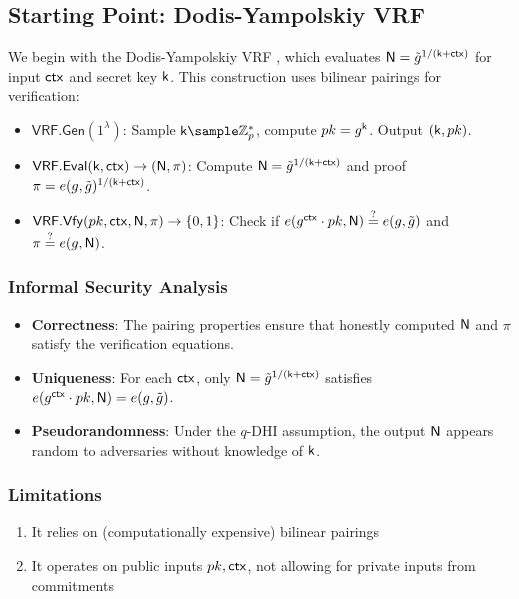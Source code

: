 \subsection{Starting Point: Dodis-Yampolskiy VRF}
We begin with the Dodis-Yampolskiy VRF \cite{hutchison_verifiable_2005}, which evaluates $\mathsf{N} = \tilde{g}^{1/(\mathsf{k} + \mathsf{ctx})}$ for input $\mathsf{ctx}$ and secret key $\mathsf{k}$. This construction uses bilinear pairings for verification:

\begin{itemize}
    \item $\mathsf{VRF.Gen}(1^\lambda)$: Sample $\k \sample \mathbb{Z}_p^*$, compute $pk = g^{\mathsf{k}}$. Output $(\mathsf{k}, pk)$.
    \item $\mathsf{VRF.Eval}(\mathsf{k}, \mathsf{ctx}) \to (\mathsf{N}, \pi)$: Compute $\mathsf{N} = \tilde{g}^{1/(\mathsf{k} + \mathsf{ctx})}$ and proof $\pi = e(g, \tilde{g})^{1/(\mathsf{k} + \mathsf{ctx})}$.
    \item $\mathsf{VRF.Vfy}(pk, \mathsf{ctx}, \mathsf{N}, \pi) \to \{0, 1\}$: Check if $e(g^{\mathsf{ctx}} \cdot pk, \mathsf{N}) \stackrel{?}{=} e(g, \tilde{g})$ and $\pi \stackrel{?}{=} e(g, \mathsf{N})$.
\end{itemize}

\subsubsection{Informal Security Analysis}
\begin{itemize}
    \item \textbf{Correctness}: The pairing properties ensure that honestly computed $\mathsf{N}$ and $\pi$ satisfy the verification equations.
    \item \textbf{Uniqueness}: For each $\mathsf{ctx}$, only $\mathsf{N} = \tilde{g}^{1/(\mathsf{k} + \mathsf{ctx})}$ satisfies $e(g^{\mathsf{ctx}} \cdot pk, \mathsf{N}) = e(g, \tilde{g})$.
    \item \textbf{Pseudorandomness}: Under the $q$-DHI assumption, the output $\mathsf{N}$ appears random to adversaries without knowledge of $\mathsf{k}$.
\end{itemize}

\subsubsection{Limitations}
\begin{enumerate}
    \item It relies on (computationally expensive) bilinear pairings
    \item It operates on public inputs $pk, \mathsf{ctx}$, not allowing for private inputs from commitments
\end{enumerate}

